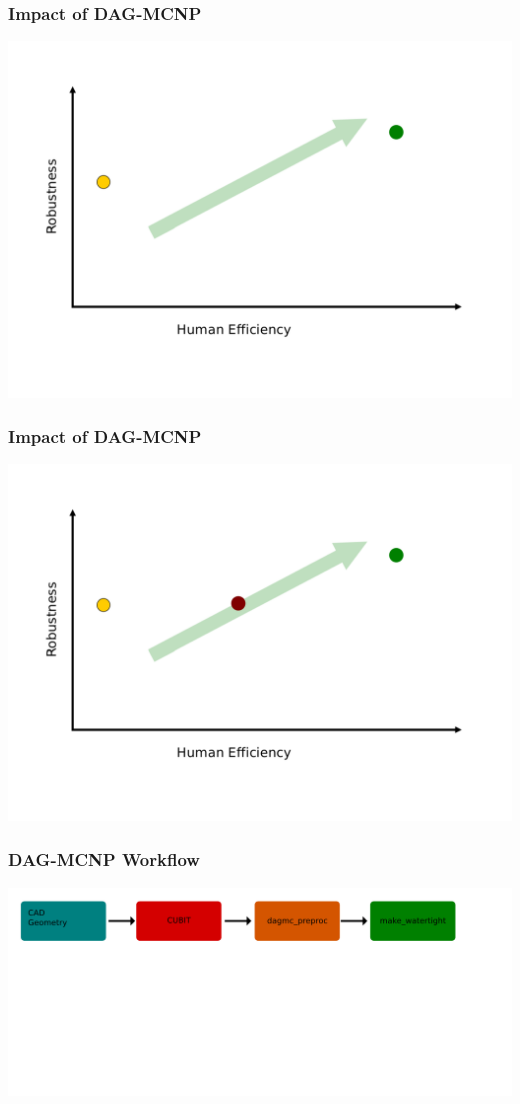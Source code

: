 \documentclass[14pt]{beamer}
\begin{document}
\begin{frame}
\frametitle{Impact of DAG-MCNP}
\vfill
\includegraphics[scale=0.43, trim = 0 0 28 0]{QualityGraph.png}
\end{frame}

\begin{frame}
\frametitle{Impact of DAG-MCNP}
\includegraphics[scale=0.43, trim = 0 0 28 0]{InitialGraphImpact.png}
\end{frame}


\begin{frame}
\frametitle{DAG-MCNP Workflow}
\includegraphics[scale=0.25, trim = 40 400 0 0]{DAGMC_Wrkflw1.png}
\end{frame}
\end{document}
